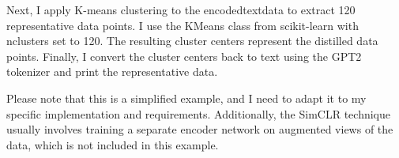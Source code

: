 \documentclass{article}
\begin{document}
\medskip

Next, I apply K-means clustering to the encoded\textunderscore text\textunderscore data to extract 120 representative data points. I use the KMeans class from scikit-learn with n\textunderscore clusters set to 120. The resulting cluster centers represent the distilled data points. Finally, I convert the cluster centers back to text using the GPT2 tokenizer and print the representative data.

\medskip

Please note that this is a simplified example, and I need to adapt it to my specific implementation and requirements. Additionally, the SimCLR technique usually involves training a separate encoder network on augmented views of the data, which is not included in this example.
\end{document}

